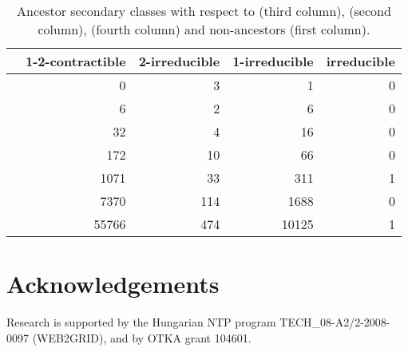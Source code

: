 \documentclass[]{article}
\begin{document}
\begin{table}\centering
    \begin{tabular}{lrrrr}
      \hline
       & 1-2-contractible & 2-irreducible & 1-irreducible & irreducible\\
      \hline
        &     0  &   3 &     1 & 0 \\
        &     6  &   2 &     6 & 0 \\
        &    32  &   4 &    16 & 0 \\
        &   172  &  10 &    66 & 0 \\
        &  1071  & 33  &   311 & {1}\\
        &  7370  & 114 &  1688 & 0 \\
       &  55766 & 474 & 10125 & {1}\\
      \hline
    \end{tabular}
  \caption{Ancestor secondary classes with respect to  (third column),  (second column),  (fourth column) and non-ancestors (first column).}
  \label{tab:restricted}
\end{table}















\section{Acknowledgements}

Research is supported by the Hungarian NTP program TECH\_08-A2/2-2008-0097 (WEB2GRID), and by OTKA grant 104601.






\clearpage



\end{document}
